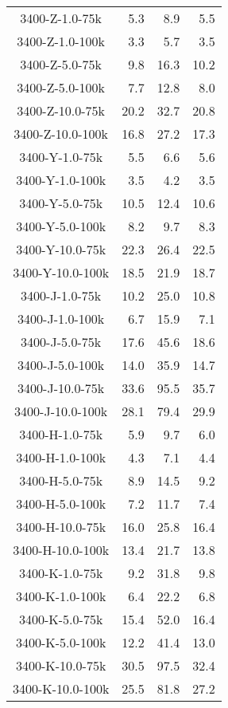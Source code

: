\begin{longtable}{crrr}
    3400-Z-1.0-75k &   5.3 &    8.9 &   5.5 \\
    3400-Z-1.0-100k &   3.3 &    5.7 &   3.5 \\
    3400-Z-5.0-75k &   9.8 &   16.3 &  10.2 \\
    3400-Z-5.0-100k &   7.7 &   12.8 &   8.0 \\
    3400-Z-10.0-75k &  20.2 &   32.7 &  20.8 \\
    3400-Z-10.0-100k &  16.8 &   27.2 &  17.3 \\
    3400-Y-1.0-75k &   5.5 &    6.6 &   5.6 \\
    3400-Y-1.0-100k &   3.5 &    4.2 &   3.5 \\
    3400-Y-5.0-75k &  10.5 &   12.4 &  10.6 \\
    3400-Y-5.0-100k &   8.2 &    9.7 &   8.3 \\
    3400-Y-10.0-75k &  22.3 &   26.4 &  22.5 \\
    3400-Y-10.0-100k &  18.5 &   21.9 &  18.7 \\
    3400-J-1.0-75k &  10.2 &   25.0 &  10.8 \\
    3400-J-1.0-100k &   6.7 &   15.9 &   7.1 \\
    3400-J-5.0-75k &  17.6 &   45.6 &  18.6 \\
    3400-J-5.0-100k &  14.0 &   35.9 &  14.7 \\
    3400-J-10.0-75k &  33.6 &   95.5 &  35.7 \\
    3400-J-10.0-100k &  28.1 &   79.4 &  29.9 \\
    3400-H-1.0-75k &   5.9 &    9.7 &   6.0 \\
    3400-H-1.0-100k &   4.3 &    7.1 &   4.4 \\
    3400-H-5.0-75k &   8.9 &   14.5 &   9.2 \\
    3400-H-5.0-100k &   7.2 &   11.7 &   7.4 \\
    3400-H-10.0-75k &  16.0 &   25.8 &  16.4 \\
    3400-H-10.0-100k &  13.4 &   21.7 &  13.8 \\
    3400-K-1.0-75k &   9.2 &   31.8 &   9.8 \\
    3400-K-1.0-100k &   6.4 &   22.2 &   6.8 \\
    3400-K-5.0-75k &  15.4 &   52.0 &  16.4 \\
    3400-K-5.0-100k &  12.2 &   41.4 &  13.0 \\
    3400-K-10.0-75k &  30.5 &   97.5 &  32.4 \\
    3400-K-10.0-100k &  25.5 &   81.8 &  27.2 \\

\end{longtable}
